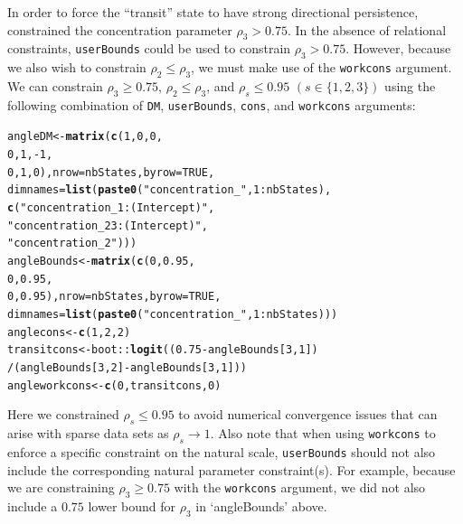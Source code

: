 \documentclass[12pt]{article}\usepackage[]{graphicx}\usepackage[]{color}
\makeatletter
\newcommand{\hlnum}[1]{\textcolor[rgb]{0.686,0.059,0.569}{#1}}%
\newcommand{\hlstr}[1]{\textcolor[rgb]{0.192,0.494,0.8}{#1}}%
\newcommand{\hlopt}[1]{\textcolor[rgb]{0,0,0}{#1}}%
\newcommand{\hlstd}[1]{\textcolor[rgb]{0.345,0.345,0.345}{#1}}%
\newcommand{\hlkwb}[1]{\textcolor[rgb]{0.69,0.353,0.396}{#1}}%
\newcommand{\hlkwc}[1]{\textcolor[rgb]{0.333,0.667,0.333}{#1}}%
\newcommand{\hlkwd}[1]{\textcolor[rgb]{0.737,0.353,0.396}{\textbf{#1}}}%
\newenvironment{kframe}{%
 \def\at@end@of@kframe{}%
 \ifinner\ifhmode%
  \def\at@end@of@kframe{\end{minipage}}%
  \begin{minipage}{\columnwidth}%
 \fi\fi%
 \def\FrameCommand##1{\hskip\@totalleftmargin \hskip-\fboxsep
 \colorbox{shadecolor}{##1}\hskip-\fboxsep
     \hskip-\linewidth \hskip-\@totalleftmargin \hskip\columnwidth}%
 \MakeFramed {\advance\hsize-\width
   \@totalleftmargin\z@ \linewidth\hsize
   \@setminipage}}%
 {\par\unskip\endMakeFramed%
 \at@end@of@kframe}
\newenvironment{knitrout}{}{} %
\makeatother
\begin{document}
In order to force the ``transit'' state to have strong directional persistence, \cite{McClintockEtAl2013c} constrained the concentration parameter $\rho_3>0.75$. In the absence of relational constraints, \verb|userBounds| could be used to constrain $\rho_3>0.75$.  However, because we also wish to constrain  $\rho_2 \le \rho_3$, we must make use of the \verb|workcons| argument.  We can constrain $\rho_3 \ge 0.75$, $\rho_2 \le \rho_3$, and $\rho_s \le 0.95$ $(s \in \{ 1,2,3 \})$ using the following combination of \verb|DM|, \verb|userBounds|, \verb|cons|, and \verb|workcons| arguments:
\begin{knitrout}
\color{fgcolor}\begin{kframe}
\begin{alltt}
\hlstd{angleDM} \hlkwb{<-} \hlkwd{matrix}\hlstd{(}\hlkwd{c}\hlstd{(}\hlnum{1}\hlstd{,}\hlnum{0}\hlstd{,}\hlnum{0}\hlstd{,}
                    \hlnum{0}\hlstd{,}\hlnum{1}\hlstd{,}\hlopt{-}\hlnum{1}\hlstd{,}
                    \hlnum{0}\hlstd{,}\hlnum{1}\hlstd{,}\hlnum{0}\hlstd{),}\hlkwc{nrow}\hlstd{=nbStates,}\hlkwc{byrow}\hlstd{=}\hlnum{TRUE}\hlstd{,}
                  \hlkwc{dimnames}\hlstd{=}\hlkwd{list}\hlstd{(}\hlkwd{paste0}\hlstd{(}\hlstr{"concentration_"}\hlstd{,}\hlnum{1}\hlopt{:}\hlstd{nbStates),}
                                \hlkwd{c}\hlstd{(}\hlstr{"concentration_1:(Intercept)"}\hlstd{,}
                                  \hlstr{"concentration_23:(Intercept)"}\hlstd{,}
                                  \hlstr{"concentration_2"}\hlstd{)))}
\hlstd{angleBounds} \hlkwb{<-} \hlkwd{matrix}\hlstd{(}\hlkwd{c}\hlstd{(}\hlnum{0}\hlstd{,}\hlnum{0.95}\hlstd{,}
                        \hlnum{0}\hlstd{,}\hlnum{0.95}\hlstd{,}
                        \hlnum{0}\hlstd{,}\hlnum{0.95}\hlstd{),}\hlkwc{nrow}\hlstd{=nbStates,}\hlkwc{byrow}\hlstd{=}\hlnum{TRUE}\hlstd{,}
                      \hlkwc{dimnames}\hlstd{=}\hlkwd{list}\hlstd{(}\hlkwd{paste0}\hlstd{(}\hlstr{"concentration_"}\hlstd{,}\hlnum{1}\hlopt{:}\hlstd{nbStates)))}
\hlstd{anglecons} \hlkwb{<-} \hlkwd{c}\hlstd{(}\hlnum{1}\hlstd{,}\hlnum{2}\hlstd{,}\hlnum{2}\hlstd{)}
\hlstd{transitcons} \hlkwb{<-} \hlstd{boot}\hlopt{::}\hlkwd{logit}\hlstd{((}\hlnum{0.75} \hlopt{-} \hlstd{angleBounds[}\hlnum{3}\hlstd{,}\hlnum{1}\hlstd{])}
                           \hlopt{/}\hlstd{(angleBounds[}\hlnum{3}\hlstd{,}\hlnum{2}\hlstd{]} \hlopt{-} \hlstd{angleBounds[}\hlnum{3}\hlstd{,}\hlnum{1}\hlstd{]))}
\hlstd{angleworkcons} \hlkwb{<-} \hlkwd{c}\hlstd{(}\hlnum{0}\hlstd{,transitcons,}\hlnum{0}\hlstd{)}
\end{alltt}
\end{kframe}
\end{knitrout}
Here we constrained $\rho_s \le 0.95$ to avoid numerical convergence issues that can arise with sparse data sets as $\rho_s \rightarrow 1$. Also note that when using \verb|workcons| to enforce a specific constraint on the natural scale, \verb|userBounds| should not also include the corresponding natural parameter constraint(s). For example, because we are constraining $\rho_3 \ge 0.75$ with the \verb|workcons| argument, we did not also include a $0.75$ lower bound for $\rho_3$ in `angleBounds' above.
\end{document}
